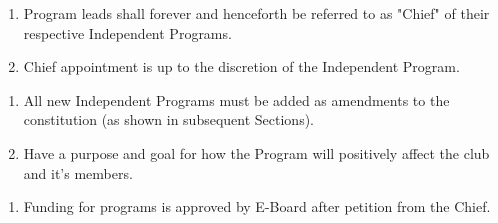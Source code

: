 


\begin{enumerate}
  \item Program leads shall forever and henceforth be referred to as "Chief" of
    their respective Independent Programs.
  \item Chief appointment is up to the discretion of the Independent Program.
\end{enumerate}


\begin{enumerate}
  \item All new Independent Programs must be added as amendments to the
    constitution (as shown in subsequent Sections).
  \item Have a purpose and goal for how the Program will positively affect the
    club and it’s members.
\end{enumerate}


\begin{enumerate}
  \item Funding for programs is approved by E-Board after petition from the
    Chief.
\end{enumerate}






